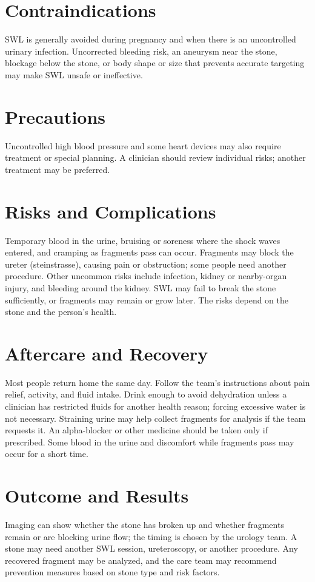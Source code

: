 \section*{Contraindications}
SWL is generally avoided during pregnancy and when there is an uncontrolled urinary infection. Uncorrected bleeding risk, an aneurysm near the stone, blockage below the stone, or body shape or size that prevents accurate targeting may make SWL unsafe or ineffective.

\section*{Precautions}
Uncontrolled high blood pressure and some heart devices may also require treatment or special planning. A clinician should review individual risks; another treatment may be preferred.

\section*{Risks and Complications}
Temporary blood in the urine, bruising or soreness where the shock waves entered, and cramping as fragments pass can occur. Fragments may block the ureter (steinstrasse), causing pain or obstruction; some people need another procedure. Other uncommon risks include infection, kidney or nearby-organ injury, and bleeding around the kidney. SWL may fail to break the stone sufficiently, or fragments may remain or grow later. The risks depend on the stone and the person's health.

\section*{Aftercare and Recovery}
Most people return home the same day. Follow the team's instructions about pain relief, activity, and fluid intake. Drink enough to avoid dehydration unless a clinician has restricted fluids for another health reason; forcing excessive water is not necessary. Straining urine may help collect fragments for analysis if the team requests it. An alpha-blocker or other medicine should be taken only if prescribed. Some blood in the urine and discomfort while fragments pass may occur for a short time.

\section*{Outcome and Results}
Imaging can show whether the stone has broken up and whether fragments remain or are blocking urine flow; the timing is chosen by the urology team. A stone may need another SWL session, ureteroscopy, or another procedure. Any recovered fragment may be analyzed, and the care team may recommend prevention measures based on stone type and risk factors.

